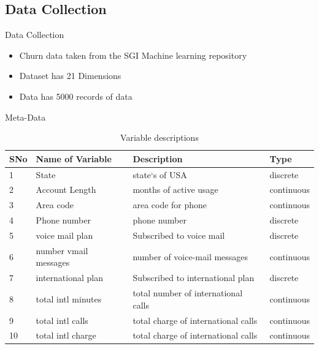 \documentclass{beamer}
\newcommand\Fontmetadata{\fontsize{8}{7.2}\selectfont}
\begin{document}
\subsection{Data Collection}
\begin{frame}{Data Collection}
	\begin{itemize}
		\item Churn data taken from the SGI Machine learning repository
		\item Dataset has 21 Dimensions
		\item Data has 5000 records of data
	\end{itemize}	
\end{frame}
\begin{frame}{Meta-Data}
	\Fontmetadata
	\begin{table}[]
		\centering
		\caption{Variable descriptions}
		\label{var-1}
		\begin{tabular}{llll}
			\hline
			SNo & Name of Variable & Description            & Type                \\
			\hline
			1 & State            & state`s of USA           & discrete            \\
			2 & Account Length   & months of active usage & continuous  \\
			3 & Area code        & area code for phone  & continuous          \\
			4 & Phone number     & phone number  & discrete           \\
			5 & voice mail plan & Subscribed to voice mail & discrete   \\
			6 & number vmail messages & number of voice-mail messages &  continuous   \\
			7 & international plan & Subscribed to international plan &  discrete   \\
			8 & total intl minutes &  total number of international calls  &  continuous   \\
			9 & total intl calls & total charge of international calls &  continuous   \\
			10 & total intl charge & total charge of international calls                       &  continuous   \\
			\hline
		\end{tabular}

	\end{table}
\end{frame}
\end{document}
